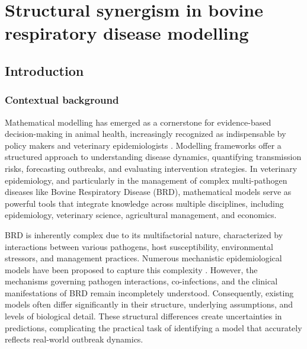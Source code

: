 
\chapter{Structural synergism in bovine respiratory disease modelling} %

\section{Introduction}
\subsection{Contextual background}


Mathematical modelling has emerged as a cornerstone for evidence-based decision-making in animal health, increasingly recognized as indispensable by policy makers and veterinary epidemiologists  \cite{Picault2024, Ezanno2022}. Modelling frameworks offer a structured approach to understanding disease dynamics, quantifying transmission risks, forecasting outbreaks, and evaluating intervention strategies. In veterinary epidemiology, and particularly in the management of complex multi-pathogen diseases like Bovine Respiratory Disease (BRD), mathematical models serve as powerful tools that integrate knowledge across multiple disciplines, including epidemiology, veterinary science, agricultural management, and economics.

BRD is inherently complex due to its multifactorial nature, characterized by interactions between various pathogens, host susceptibility, environmental stressors, and management practices. Numerous mechanistic epidemiological models have been proposed to capture this complexity \cite{picault_modelling_2022, sorindupont_modeling_2023}. However, the mechanisms governing pathogen interactions, co-infections, and the clinical manifestations of BRD remain incompletely understood. Consequently, existing models often differ significantly in their structure, underlying assumptions, and levels of biological detail. These structural differences create uncertainties in predictions, complicating the practical task of identifying a model that accurately reflects real-world outbreak dynamics.


